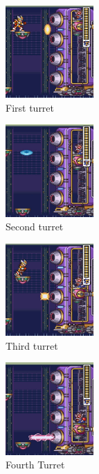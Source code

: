 \begin{figure}[htp]
	\centering
	\begin{subfigure}{0.32\linewidth}
		\centering
		\includegraphics[height=3.5cm]{figures/X2/Hunter_stages/Serges_tank_1.png}
		\caption{First turret}	
	\end{subfigure}
	\begin{subfigure}{0.32\linewidth}
		\centering
		\includegraphics[height=3.5cm]{figures/X2/Hunter_stages/Serges_tank_2.png}
		\caption{Second turret}
	\end{subfigure}
	\begin{subfigure}{.3\linewidth}
		\centering
		\includegraphics[height=3.5cm]{figures/X2/Hunter_stages/Serges_tank_3.png}
		\caption{Third turret}
	\end{subfigure}
	\begin{subfigure}{.32\linewidth}
		\centering
		\includegraphics[height=3.5cm]{figures/X2/Hunter_stages/Serges_tank_4.png}
		\caption{Fourth Turret}
	\end{subfigure}
	\begin{subfigure}{.32\linewidth}

\end{subfigure}
\end{figure}
